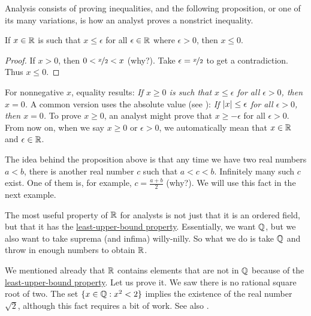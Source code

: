 Analysis consists of proving inequalities, and
the following proposition, or one of its many variations,
is how an analyst proves a nonstrict inequality.

\begin{prop}
If $x \in {\mathbb{R}}$ is such that $x \leq \epsilon$ for all
$\epsilon \in {\mathbb{R}}$ where
$\epsilon > 0$, then $x \leq 0$.
\end{prop}

\begin{proof}
If $x > 0$, then $0 < \nicefrac{x}{2} < x$ (why?).  Take
$\epsilon = \nicefrac{x}{2}$ to get a contradiction.  Thus $x \leq 0$.
\end{proof}

For nonnegative $x$, equality results:
\emph{If $x \geq 0$ is such that $x \leq \epsilon$ for all
$\epsilon > 0$, then $x = 0$.}
A common version uses the absolute value (see ):
\emph{If $\lvert {x} \rvert \leq \epsilon$ for all
$\epsilon > 0$, then $x = 0$.}
To prove $x \geq 0$, an analyst might prove
that $x \geq -\epsilon$ for all $\epsilon > 0$.
From now on, when we say $x \geq 0$ or
$\epsilon > 0$, we automatically mean that $x \in {\mathbb{R}}$ and $\epsilon \in {\mathbb{R}}$.

The idea behind the proposition above is that
any time we have two real numbers $a < b$, there is another
real number $c$ such that
$a < c < b$.  Infinitely many such $c$ exist.  One of them is, for example,
$c = \frac{a+b}{2}$ (why?).
We will use this fact in the next example.

The most useful property of ${\mathbb{R}}$ for analysts
is not just that it is an ordered field, but that it has the
\hyperref[defn:lub]{least-upper-bound property}.
Essentially, we want ${\mathbb{Q}}$, but we also
want to take suprema (and infima) willy-nilly.
So what we do is take ${\mathbb{Q}}$ and throw in enough numbers to obtain ${\mathbb{R}}$.

We mentioned already that ${\mathbb{R}}$ contains elements that are not in ${\mathbb{Q}}$
because of the \hyperref[defn:lub]{least-upper-bound property}.  Let us
prove it.
We saw there is no
rational square root of two.  The set
$\{ x \in {\mathbb{Q}} : x^2 < 2 \}$ implies the existence of the real number
$\sqrt{2}$, although this fact requires a bit of work.  See also
.


